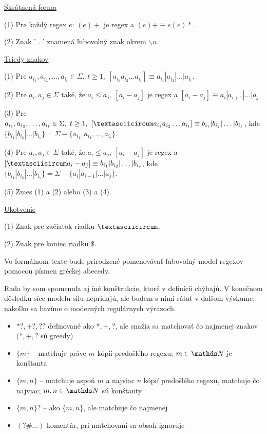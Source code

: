 \underline{Skrátnená forma}
\begin{list}{}{}
\item[(1)] Pre každý regex $e$: $(e)+$ je regex a $(e)+ \equiv e(e)*$.
\item[(2)] Znak ' . ' znamená ľubovolný znak okrem $\backslash n$.
\end{list}

\underline{Triedy znakov}
\begin{list}{}{}
\item[(1)] Pre $a_{i_1},a_{i_2},\dots ,a_{i_t} \in \Sigma,~t \geq 1,~\left[ a_{i_1}a_{i_2}\dots a_{i_t} \right] \equiv a_{i_1}|a_{i_2}|\dots |a_{i_t} $.
\item[(2)] Pre $a_i,a_j \in \Sigma$ také, že $a_i\leq a_j,~ [a_i-a_j]$ je regex a $[a_i-a_j]\equiv a_i|a_{i+1}|\dots |a_j$.
\item[(3)] Pre $a_{i_1},a_{i_2},\dots ,a_{i_t} \in \Sigma,~t \geq 1,~\left[ \textasciicircum a_{i_1}a_{i_2}\dots a_{i_t} \right] \equiv b_{i_1}|b_{i_2}|\dots |b_{i_s} $, kde $\lbrace b_{i_1}|b_{i_2}|\dots |b_{i_s}\rbrace = \Sigma - \lbrace a_{i_1},a_{i_2},\dots ,a_{i_t} \rbrace$.
\item[(4)] Pre $a_i,a_j \in \Sigma$ také, že $a_i\leq a_j,~ [a_i-a_j]$ je regex a $[\textasciicircum a_i-a_j]\equiv b_{i_1}|b_{i_2}|\dots |b_{i_s}$, kde $\lbrace b_{i_1}|b_{i_2}|\dots |b_{i_s}\rbrace = \Sigma - \lbrace a_i|a_{i+1}|\dots |a_j \rbrace$.
\item[(5)] Zmes (1) a (2) alebo (3) a (4).
\end{list}

\underline{Ukotvenie}
\begin{list}{}{}
\item[(1)] Znak pre začiatok riadku $ \textasciicircum $.
\item[(2)] Znak pre koniec riadku $ \mathdollar $.
\end{list}

Vo formálnom texte bude prirodzené pomenovávať ľubovoľný model regexov pomocou písmen gréckej abecedy.

Rada by som spomenula aj iné konštrukcie, ktoré v definícii chýbajú. V konečnom dôsledku síce modelu silu nepridajú, ale budem s nimi rátať v ďalšom výskume, nakoľko sa bavíme o moderných regulárnych výrazoch.

\begin{itemize}
\item $*?,+?,??$ definované ako $*,+,?$, ale snažia sa matchovať čo najmenej znakov ($*,+,?$ sú greedy)
\item $\lbrace m \rbrace$ -- matchuje práve $m$ kópií predošlého regexu; $m \in \N$ je konštanta
\item $ \lbrace m,n \rbrace$ -- matchuje aspoň $m$ a najviac $n$ kópií predošlého regexu, matchuje čo najviac; $m, n \in \N$ sú konštanty
\item $ \lbrace m,n \rbrace ?$ -- ako $ \lbrace m,n \rbrace$, ale matchuje čo najmenej
\item $(?\#\dots )$ komentár, pri matchovaní sa obsah ignoruje
\end{itemize}

